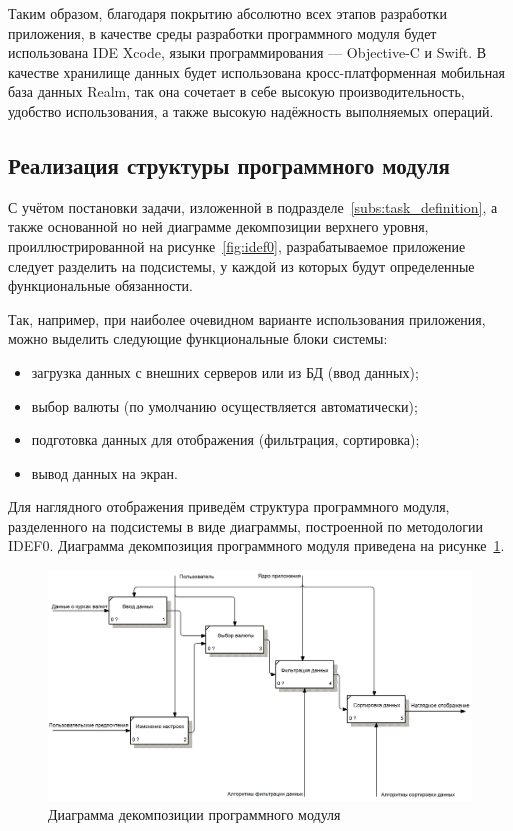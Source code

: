 Таким образом, благодаря покрытию абсолютно всех этапов разработки приложения,
в качестве среды разработки программного модуля будет использована IDE Xcode,
языки программирования --- Objective-C и Swift.
В качестве хранилище данных будет использована кросс-платформенная мобильная
база данных Realm, так она сочетает в себе высокую производительность,
удобство использования, а также высокую надёжность выполняемых операций.

\pagebreak



\subsection{Реализация структуры программного модуля}

С учётом постановки задачи, изложенной в подразделе~\ref{subs:task_definition},
а также основанной но ней диаграмме декомпозиции верхнего уровня,
проиллюстрированной на рисунке~\ref{fig:idef0}, разрабатываемое
приложение следует разделить на подсистемы, у каждой из которых будут
определенные функциональные обязанности.

Так, например, при наиболее очевидном варианте использования приложения,
можно выделить следующие функциональные блоки системы:
\begin{itemize}
  \item загрузка данных с внешних серверов или из БД (ввод данных);
  \item выбор валюты (по умолчанию осуществляется автоматически);
  \item подготовка данных для отображения (фильтрация, сортировка);
  \item вывод данных на экран.
\end{itemize}

Для наглядного отображения приведём структура программного модуля,
разделенного на подсистемы в виде диаграммы, построенной по методологии IDEF0.
Диаграмма декомпозиция программного модуля приведена
на рисунке~\ref{fig:idef0_structure}.
\begin{figure}[h!]
  \centering
  \includegraphics[width=160mm]{fig/IDEF0_structure}
  \caption{Диаграмма декомпозиции программного модуля}
  \label{fig:idef0_structure}
\end{figure}



